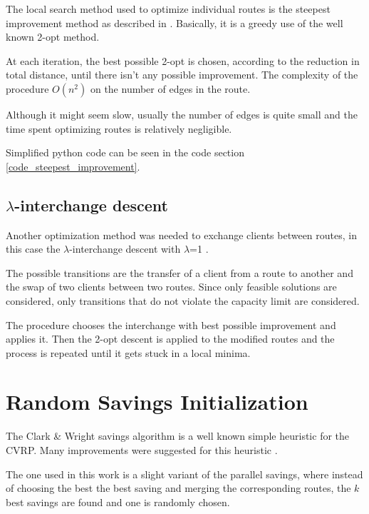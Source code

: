 \documentclass{article} %
\begin{document}
The local search method used to optimize individual routes is the steepest improvement method as described in \citep{steepest_improvement}.
Basically, it is a greedy use of the well known 2-opt method.\newline

At each iteration, the best possible 2-opt is chosen, according to the reduction in total distance, until there isn't any possible improvement. The complexity of the procedure $O(n^{2})$ on the number of edges in the route.\newline

Although it might seem slow, usually the number of edges is quite small and the time spent optimizing routes is relatively negligible.\newline

Simplified python code can be seen in the code section \ref{code_steepest_improvement}.


\subsection{$\lambda$-interchange descent}
\label{local_cluster}
Another optimization method was needed to exchange clients between routes, in this case the $\lambda$-interchange descent with $\lambda$=1 \citep{osman1993}.\newline

The possible transitions are the transfer of a client from a route to another and the swap of two clients between two routes. Since only feasible solutions are considered, only transitions that do not violate the capacity limit are considered.\newline

The procedure chooses the interchange with best possible improvement and applies it. Then the 2-opt descent is applied to the modified routes and the process is repeated until it gets stuck in a local minima.


\newpage
\section{Random Savings Initialization}
\label{random_savings}
The Clark \& Wright savings algorithm is a well known simple heuristic for the CVRP.
Many improvements were suggested for this heuristic \cite{clark_wright_ds}.\newline

The one used in this work is a slight variant of the parallel savings, where instead of choosing the best the best saving and merging the corresponding routes, the $k$ best savings are found and one is randomly chosen.\newline
\end{document}
